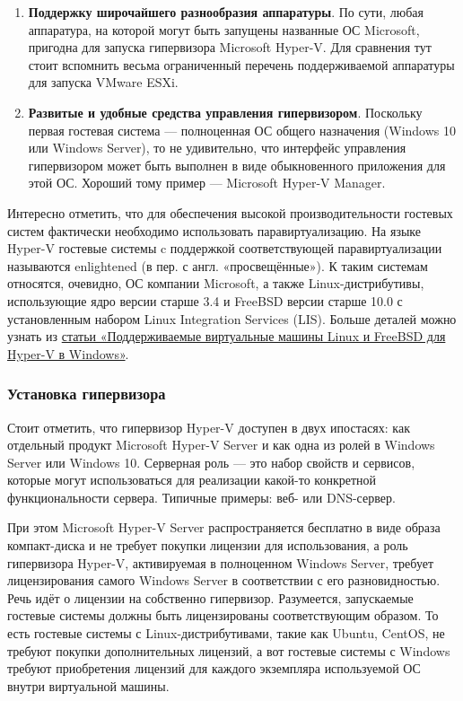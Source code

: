 \documentclass[14pt, a4paper]{article}
\begin{document}
\begin{enumerate}
    \item \textbf{Поддержку широчайшего разнообразия аппаратуры}. По сути, любая аппаратура, на
    которой могут быть запущены названные ОС Microsoft, пригодна для запуска гипервизора
    Microsoft Hyper-V. Для сравнения тут стоит вспомнить весьма ограниченный перечень
    поддерживаемой аппаратуры для запуска VMware ESXi.
    \item \textbf{Развитые и удобные средства управления гипервизором}. Поскольку первая гостевая
    система — полноценная ОС общего назначения (Windows 10 или Windows Server), то не
    удивительно, что интерфейс управления гипервизором может быть выполнен в виде
    обыкновенного приложения для этой ОС. Хороший тому пример — Microsoft Hyper-V Manager.
\end{enumerate}

Интересно отметить, что для обеспечения высокой производительности гостевых систем фактически
необходимо использовать паравиртуализацию. На языке Hyper-V гостевые системы c поддержкой
соответствующей паравиртуализации называются enlightened (в пер. с англ. «просвещённые»). К
таким системам относятся, очевидно, ОС компании Microsoft, а также Linux-дистрибутивы,
использующие ядро версии старше 3.4 и FreeBSD версии старше 10.0 с установленным набором
Linux Integration Services (LIS). Больше деталей можно узнать из \href{https://docs.microsoft.com/ru-ru/windows-server/virtualization/hyper-v/supported-linux-and-freebsd-virtual-machines-for-hyper-v-on-windows}{статьи «Поддерживаемые
виртуальные машины Linux и FreeBSD для Hyper-V в Windows»}.\\


\subsubsection*{Установка гипервизора}

Стоит отметить, что гипервизор Hyper-V доступен в двух ипостасях: как отдельный продукт Microsoft
Hyper-V Server и как одна из ролей в Windows Server или Windows 10. Серверная роль — это набор
свойств и сервисов, которые могут использоваться для реализации какой-то конкретной
функциональности сервера. Типичные примеры: веб- или DNS-сервер.

При этом Microsoft Hyper-V Server распространяется бесплатно в виде образа компакт-диска и не
требует покупки лицензии для использования, а роль гипервизора Hyper-V, активируемая в
полноценном Windows Server, требует лицензирования самого Windows Server в соответствии с его
разновидностью. Речь идёт о лицензии на собственно гипервизор. Разумеется, запускаемые гостевые
системы должны быть лицензированы соответствующим образом. То есть гостевые системы с
Linux-дистрибутивами, такие как Ubuntu, CentOS, не требуют покупки дополнительных лицензий, а вот
гостевые системы с Windows требуют приобретения лицензий для каждого экземпляра используемой
ОС внутри виртуальной машины.
\end{document}
